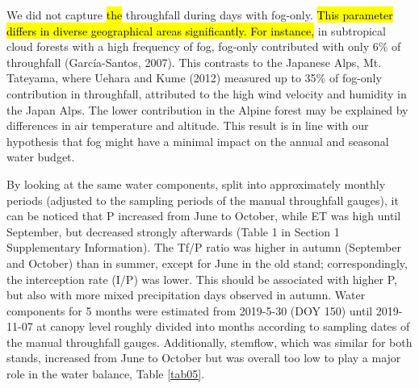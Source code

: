 \documentclass[10pt,letterpaper]{article}
\begin{document}
We did not capture \hl{the} throughfall during days with fog-only. \hl{This parameter differs in diverse geographical areas significantly. For instance, }in subtropical cloud forests with a high frequency of fog, fog-only contributed with only 6\% of throughfall (García-Santos, 2007). This contrasts to the Japanese Alps, Mt. Tateyama, where Uehara and Kume (2012) measured up to 35\% of fog-only contribution in throughfall, attributed to the high wind velocity and humidity in the Japan Alps. The lower contribution in the Alpine forest may be explained by differences in air temperature and altitude. This result is in line with our hypothesis that fog might have a minimal impact on the annual and seasonal water budget. 

By looking at the same water components, split into approximately monthly periods (adjusted to the sampling periods of the manual throughfall gauges), it can be noticed that P increased from June to October, while ET was high until September, but decreased strongly afterwards (Table 1 in Section 1 Supplementary Information). The Tf/P ratio was higher in autumn (September and October) than in summer, except for June in the old stand; correspondingly, the interception rate (I/P) was lower. This should be associated with higher P, but also with more mixed precipitation days observed in autumn. Water components for 5 months were estimated from 2019-5-30 (DOY 150) until 2019-11-07 at canopy level roughly divided into months according to sampling dates of the manual throughfall gauges. Additionally, stemflow, which was similar for both stands, increased from June to October but was overall too low to play a major role in the water balance, Table \ref{tab05}.
\end{document}
